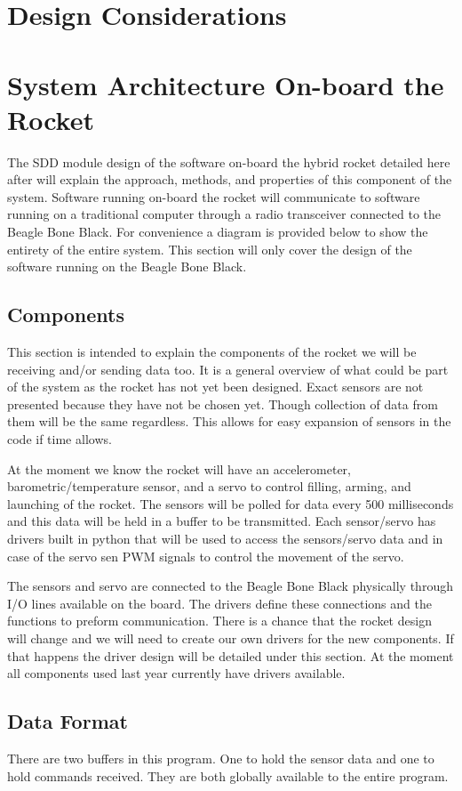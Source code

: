 \documentclass[10pt,draftclsnofoot,onecolumn,compsoc]{IEEEtran}
\begin{document}
\section{Design Considerations}
\section{System Architecture On-board the Rocket }	
The SDD module design of the software on-board the hybrid rocket detailed here after will explain the approach, methods, and properties of this component of the system. Software running on-board the rocket will communicate to software running on a traditional computer through a radio transceiver connected to the Beagle Bone Black. For convenience a diagram is provided below to show the entirety of the entire system. This section will  only cover the design of the software running on the Beagle Bone Black.
\subsection{Components} 
This section is intended to explain the components of the rocket we will be receiving and/or sending data too. It is a general overview of what could be part of the system as the rocket has not yet been designed. Exact sensors are not presented because they have not be chosen yet. Though collection of data from them will be the same regardless. This allows for easy expansion of sensors in the code if time allows.\par
At the moment we know the rocket will have an accelerometer, barometric/temperature sensor, and a servo to control filling, arming, and launching of the rocket. The sensors will be polled for data every 500 milliseconds and this data will be held in a buffer to be transmitted. Each sensor/servo has drivers built in python that will be used to access the sensors/servo data and in case of the servo sen PWM signals to control the movement of the servo.\par
The sensors and servo are connected to the Beagle Bone Black physically through I/O lines available on the board. The drivers define these connections and the functions to preform communication. There is a chance that the rocket design will change and we will need to create our own drivers for the new components. If that happens the driver design will be detailed under this section. At the moment all components used last year currently have drivers available.\par
\subsection{Data Format}
There are two buffers in this program. One to hold the sensor data and one to hold commands received. They are both globally available to the entire program.
\end{document}
